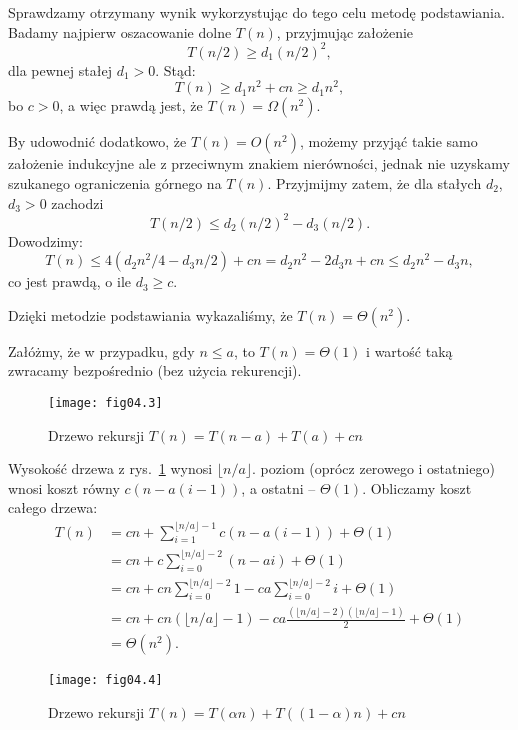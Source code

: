 Sprawdzamy otrzymany wynik wykorzystując do tego celu metodę podstawiania. Badamy najpierw oszacowanie dolne $T(n)$, przyjmując założenie
\[
	T(n/2) \ge d_1(n/2)^2,
\]
dla pewnej stałej $d_1>0$. Stąd:
\[
	T(n) \ge d_1n^2+cn \ge d_1n^2, 
\]
bo $c>0$, a więc prawdą jest, że $T(n)=\Omega(n^2)$.

By udowodnić dodatkowo, że $T(n)=O(n^2)$, możemy przyjąć takie samo założenie indukcyjne ale z przeciwnym znakiem nierówności, jednak nie uzyskamy szukanego ograniczenia górnego na $T(n)$. Przyjmijmy zatem, że dla stałych $d_2$,~$d_3>0$ zachodzi
\[
	T(n/2) \le d_2(n/2)^2-d_3(n/2).
\]
Dowodzimy:
\[
	T(n) \le 4(d_2n^2\!/4-d_3n/2)+cn = d_2n^2-2d_3n+cn \le d_2n^2-d_3n,
\]
co jest prawdą, o ile $d_3\ge c$.

Dzięki metodzie podstawiania wykazaliśmy, że $T(n)=\Theta(n^2)$.

\exercise{} %
Załóżmy, że w przypadku, gdy $n\le a$, to $T(n)=\Theta(1)$ i wartość taką zwracamy bezpośrednio (bez użycia rekurencji).
\begin{figure}[ht]
	\begin{center}
		\texttt{[image: fig04.3]}
	\end{center}
	\caption{Drzewo rekursji $T(n)=T(n-a)+T(a)+cn$} \label{fig:4.2-4}
\end{figure}
Wysokość drzewa z rys.~\ref{fig:4.2-4} wynosi $\lfloor n/a\rfloor$.  poziom (oprócz zerowego i ostatniego) wnosi koszt równy $c(n-a(i-1))$, a ostatni -- $\Theta(1)$. Obliczamy koszt całego drzewa:
\begin{align*}
	T(n) &= cn+\sum_{i=1}^{\lfloor n/a\rfloor-1}c(n-a(i-1))+\Theta(1) \\
	&= cn+c\sum_{i=0}^{\lfloor n/a\rfloor-2}(n-ai)+\Theta(1) \\
	&= cn+cn\sum_{i=0}^{\lfloor n/a\rfloor-2}1-ca\sum_{i=0}^{\lfloor n/a\rfloor-2}i+\Theta(1) \\
	&= cn+cn(\lfloor n/a\rfloor-1)-ca\frac{(\lfloor n/a\rfloor-2)(\lfloor n/a\rfloor-1)}{2}+\Theta(1) \\[2mm]
	&= \Theta(n^2).
\end{align*}

\exercise{} %
\begin{figure}[ht]
	\begin{center}
		\texttt{[image: fig04.4]}
	\end{center}
	\caption{Drzewo rekursji $T(n)=T(\alpha n)+T((1-\alpha)n)+cn$} \label{fig:4.2-5}
\end{figure}

